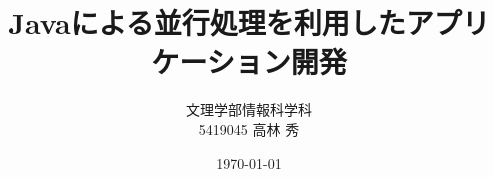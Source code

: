 \documentclass[dvipdfmx]{jsarticle}
\title{Javaによる並行処理を利用したアプリケーション開発}
\author{文理学部情報科学科\\5419045 高林 秀}
\date{\today}
\begin{document}
\maketitle

\begin{abstract}

\end{abstract}
\end{document}
